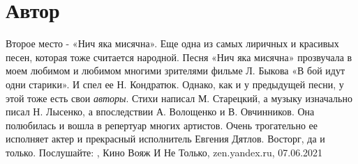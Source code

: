  
 
 
 
 
\chapter{Автор}

Второе место - «Нич яка мисячна». Еще одна из самых лиричных и красивых песен,
которая тоже считается народной. Песня «Нич яка мисячна» прозвучала в моем
любимом и любимом многими зрителями фильме Л. Быкова «В бой идут одни старики».
И спел ее Н. Кондратюк. Однако, как и у предыдущей песни, у этой тоже есть свои
\emph{авторы}. Стихи написал М. Старецкий, а музыку изначально писал Н. Лысенко, а
впоследствии А. Волощенко и В. Овчинников.  Она полюбилась и вошла в репертуар
многих артистов. Очень трогательно ее исполняет актер и прекрасный исполнитель
Евгения Дятлов. Восторг, да и только. Послушайте:
, 
Кино Вояж И Не Только, zen.yandex.ru, 07.06.2021
